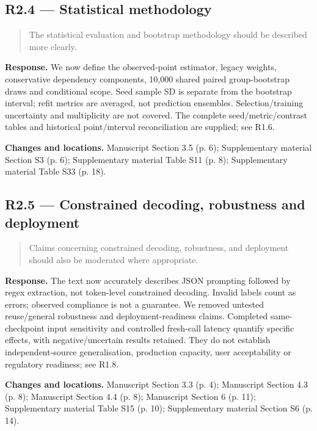 \documentclass[11pt,a4paper]{article}
\begin{document}
\subsection*{R2.4 — Statistical methodology}
\begin{quote}\small The statistical evaluation and bootstrap methodology should be described more clearly.\end{quote}
\textbf{Response.} We now define the observed-point estimator, legacy weights, conservative dependency components, 10,000 shared paired group-bootstrap draws and conditional scope. Seed sample SD is separate from the bootstrap interval; refit metrics are averaged, not prediction ensembles. Selection/training uncertainty and multiplicity are not covered. The complete seed/metric/contrast tables and historical point/interval reconciliation are supplied; see R1.6.

\textbf{Changes and locations.} Manuscript Section 3.5 (p. 6); Supplementary material Section S3 (p. 6); Supplementary material Table S11 (p. 8); Supplementary material Table S33 (p. 18).

\subsection*{R2.5 — Constrained decoding, robustness and deployment}
\begin{quote}\small Claims concerning constrained decoding, robustness, and deployment should also be moderated where appropriate.\end{quote}
\textbf{Response.} The text now accurately describes JSON prompting followed by regex extraction, not token-level constrained decoding. Invalid labels count as errors; observed compliance is not a guarantee. We removed untested reuse/general robustness and deployment-readiness claims. Completed same-checkpoint input sensitivity and controlled fresh-call latency quantify specific effects, with negative/uncertain results retained. They do not establish independent-source generalisation, production capacity, user acceptability or regulatory readiness; see R1.8.

\textbf{Changes and locations.} Manuscript Section 3.3 (p. 4); Manuscript Section 4.3 (p. 8); Manuscript Section 4.4 (p. 8); Manuscript Section 6 (p. 11); Supplementary material Table S15 (p. 10); Supplementary material Section S6 (p. 14).
\end{document}
